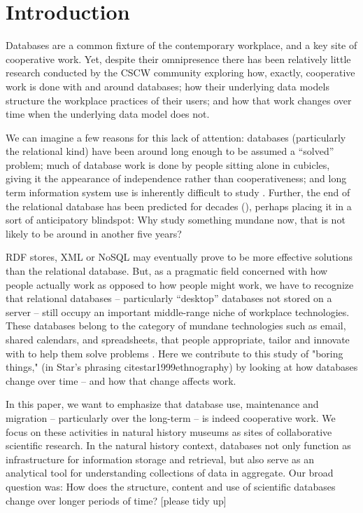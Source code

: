 \section{Introduction}

Databases are a common fixture of the contemporary workplace, and a key site of cooperative work. Yet, despite their omnipresence there has been relatively little research conducted by the CSCW community exploring how, exactly, cooperative work is done with and around databases;  how their underlying data models structure the workplace practices of their users; and how that work changes over time when the underlying data model does not. 

We can imagine a few reasons for this lack of attention: databases (particularly the relational kind) have been around long enough to be assumed a “solved” problem; much of database work is done by people sitting alone in cubicles, giving it the appearance of independence rather than cooperativeness; and long term information system use is inherently difficult to study \cite{Pipek_2002}. Further, the end of the relational database has been predicted for decades (\cite{Atzeni_2013}), perhaps placing it in a sort of anticipatory blindspot: Why study something mundane now, that is not likely to be around in another five years? 

RDF stores, XML or NoSQL may eventually prove to be more effective solutions than the relational database. But, as a pragmatic field concerned with how people actually work as opposed to how people might work, we have to recognize that relational databases – particularly “desktop” databases not stored on a server – still occupy an important middle-range niche of workplace technologies. These databases belong to the category of mundane technologies such as email, shared calendars, and spreadsheets, that people appropriate, tailor and innovate with to help them solve problems  \cite{bellotti2005quality, palen1999social, nardi1991twinkling}. Here we contribute to this study of "boring things," (in Star's phrasing cite{star1999ethnography}) by looking at how databases change over time -- and how that change affects work.


In this paper, we want to emphasize that database use, maintenance and migration – particularly over the long-term – is indeed cooperative work. We focus on these activities in natural history museums as sites of collaborative scientific research. In the natural history context, databases not only function as infrastructure for information storage and retrieval, but also serve as an analytical tool for understanding collections of data in aggregate. Our broad question was: How does the structure, content and use of scientific databases change over longer periods of time? [please tidy up]

